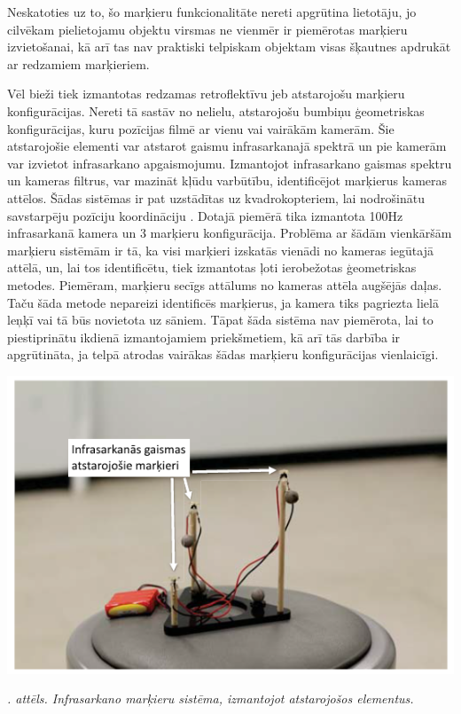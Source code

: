 \documentclass[12pt, a4paper, oneside, openright]{article}
\renewcommand{\thecimages}{\arabic{cimages}}
\begin{document}
Neskatoties uz to, šo marķieru funkcionalitāte nereti apgrūtina lietotāju, jo cilvēkam pielietojamu
objektu virsmas ne vienmēr ir piemērotas marķieru izvietošanai, kā arī tas nav praktiski telpiskam objektam visas 
šķautnes apdrukāt ar redzamiem marķieriem.

\par
Vēl bieži tiek izmantotas redzamas retroflektīvu jeb atstarojošu marķieru konfigurācijas. Nereti
tā sastāv no nelielu, atstarojošu bumbiņu ģeometriskas konfigurācijas, kuru pozīcijas filmē ar vienu vai 
vairākām kamerām. Šie atstarojošie elementi var atstarot gaismu infrasarkanajā spektrā un pie kamerām 
var izvietot infrasarkano apgaismojumu. Izmantojot infrasarkano gaismas spektru un kameras filtrus, 
var mazināt kļūdu varbūtību, identificējot marķierus kameras attēlos. Šādas sistēmas ir pat uzstādītas
uz kvadrokopteriem, lai nodrošinātu savstarpēju pozīciju koordināciju \cite{MarkCutler2013}. Dotajā piemērā
tika izmantota 100Hz infrasarkanā kamera un 3 marķieru konfigurācija. 
Problēma ar šādām vienkāršām marķieru sistēmām ir tā, ka visi marķieri izskatās vienādi no kameras iegūtajā attēlā,
un, lai tos identificētu, tiek izmantotas ļoti ierobežotas ģeometriskas metodes. Piemēram, marķieru
secīgs attālums no kameras attēla augšējās daļas. Taču šāda metode nepareizi identificēs marķierus,
ja kamera tiks pagriezta lielā leņķī vai tā būs novietota uz sāniem. Tāpat šāda sistēma nav piemērota, lai 
to piestiprinātu ikdienā izmantojamiem priekšmetiem, kā arī tās darbība ir apgrūtināta, ja telpā atrodas
vairākas šādas marķieru konfigurācijas vienlaicīgi.

\label{cimages:MarkCutler2013_1}
\vspace{10pt}
\begin{samepage}
\begin{center}
\includegraphics[width=0.5\columnwidth]{images/MarkCutler2013_1.png}
\begin{center}
\footnotesize{
\textit{\thecimages. attēls. Infrasarkano marķieru sistēma, izmantojot atstarojošos elementus.}}
\end{center}
\end{center}
\end{samepage}
\end{document}
